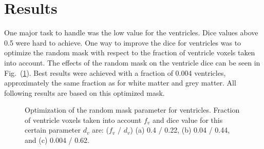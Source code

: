 \documentclass[journal]{IEEEtran}
\begin{document}
\section{Results}
One major task to handle was the low value for the ventricles. Dice values above 0.5 were hard to achieve. One way to improve the dice for ventricles was to optimize the random mask with respect to the fraction of ventricle voxels taken into account. The effects of the random mask on the ventricle dice can be seen in Fig.~(\ref{f.random_mask}). Best results were achieved with a fraction of 0.004 ventricles, approximately the same fraction as for white matter and grey matter. All following results are based on this optimized mask.
\begin{figure}[h!]
	\centering
	\hfill
	\hfill
	\caption{Optimization of the random mask parameter for ventricles. Fraction of ventricle voxels taken into account $f_v$ and dice value for this certain parameter $d_v$ are: ($f_v$ / $d_v$) (a) 0.4 / 0.22, (b) 0.04 / 0.44, and (c) 0.004 / 0.62.}
	\label{f.random_mask}
\end{figure}
\end{document}
